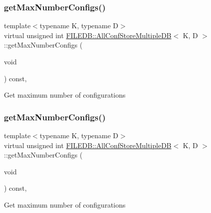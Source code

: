 \subsubsection{\texorpdfstring{getMaxNumberConfigs()}{getMaxNumberConfigs()}\hspace{0.1cm}{\footnotesize\ttfamily [1/3]}}
{\footnotesize\ttfamily template$<$typename K, typename D$>$ \\
virtual unsigned int \mbox{\hyperlink{classFILEDB_1_1AllConfStoreMultipleDB}{F\+I\+L\+E\+D\+B\+::\+All\+Conf\+Store\+Multiple\+DB}}$<$ K, D $>$\+::get\+Max\+Number\+Configs (\begin{DoxyParamCaption}\item[{void}]{ }\end{DoxyParamCaption}) const\hspace{0.3cm}{\ttfamily [inline]}, {\ttfamily [virtual]}}

Get maximum number of configurations \mbox{\label{classFILEDB_1_1AllConfStoreMultipleDB_a9348ec8716b4c716df67dca608bb1bde}} 
\subsubsection{\texorpdfstring{getMaxNumberConfigs()}{getMaxNumberConfigs()}\hspace{0.1cm}{\footnotesize\ttfamily [2/3]}}
{\footnotesize\ttfamily template$<$typename K, typename D$>$ \\
virtual unsigned int \mbox{\hyperlink{classFILEDB_1_1AllConfStoreMultipleDB}{F\+I\+L\+E\+D\+B\+::\+All\+Conf\+Store\+Multiple\+DB}}$<$ K, D $>$\+::get\+Max\+Number\+Configs (\begin{DoxyParamCaption}\item[{void}]{ }\end{DoxyParamCaption}) const\hspace{0.3cm}{\ttfamily [inline]}, {\ttfamily [virtual]}}

Get maximum number of configurations \mbox{\label{classFILEDB_1_1AllConfStoreMultipleDB_a9348ec8716b4c716df67dca608bb1bde}} 
